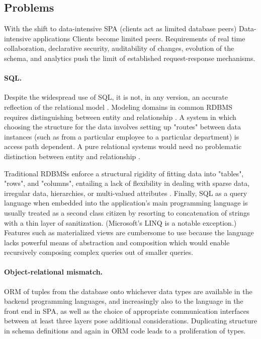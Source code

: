 \subsection{Problems}
With the shift to data-intensive \gls{SPA} (clients act as limited database peers)
Data-intensive applications
Clients become limited peers.
Requirements of real time collaboration, declarative security, auditability of changes, evolution of the schema, and analytics push the limit of established request-response mechanisms.


\paragraph{\gls{SQL}.}
Despite the widespread use of SQL, it is not, in any version, an accurate reflection of the relational model \cite{codd1990relational} \cite{tarpit}.
Modeling domains in common \gls{RDBMS} requires distinguishing between entity and relationship \cite{chen1976entity}. A system in which choosing the structure for the data involves setting up "routes" between data instances (such as from a particular employee to a particular department) is access path dependent. A pure relational systems would need no problematic distinction between entity and relationship \cite{tarpit}.

Traditional RDBMSs enforce a structural rigidity of fitting data into "tables", "rows", and "columns", entailing a lack of flexibility in dealing with sparse data, irregular data, hierarchies, or multi-valued attributes \cite{hickey2012dbvalue}. Finally, SQL as a query language when embedded into the application's main programming language is usually treated as a second class citizen by resorting to concatenation of strings with a thin layer of sanitization. (Microsoft's LINQ \cite{meijer2006linq} is a notable exception.) Features such as materialized views are cumbersome to use because the language lacks powerful means of abstraction and composition \cite{sicp} which would enable recursively composing complex queries out of smaller queries.

\paragraph{Object-relational mismatch.}
\gls{ORM} of tuples from the database onto whichever data types are available in the backend programming languages, and increasingly also to the language in the front end in \gls{SPA}, as well as the choice of appropriate communication interfaces between at least three layers pose additional considerations. Duplicating structure in schema definitions and again in ORM code leads to a proliferation of types.

